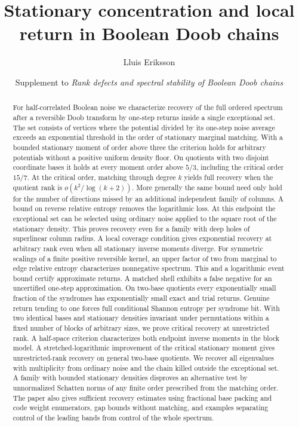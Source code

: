 \documentclass[11pt]{article}
\title{Stationary concentration and local return in Boolean Doob chains}
\author{Lluis Eriksson}
\date{Supplement to \emph{Rank defects and spectral stability of Boolean Doob chains}}
\begin{document}
\maketitle
\begin{abstract}
For half-correlated Boolean noise we characterize recovery of the full ordered spectrum after a reversible Doob transform by one-step returns inside a single exceptional set. The set consists of vertices where the potential divided by its one-step noise average exceeds an exponential threshold in the order of stationary marginal matching. With a bounded stationary moment of order above three the criterion holds for arbitrary potentials without a positive uniform density floor. On quotients with two disjoint coordinate bases it holds at every moment order above $5/3$, including the critical order $15/7$. At the critical order, matching through degree $k$ yields full recovery when the quotient rank is $o(k^2/\log(k+2))$. More generally the same bound need only hold for the number of directions missed by an additional independent family of columns. A bound on reverse relative entropy removes the logarithmic loss. At this endpoint the exceptional set can be selected using ordinary noise applied to the square root of the stationary density. This proves recovery even for a family with deep holes of superlinear column radius. A local coverage condition gives exponential recovery at arbitrary rank even when all stationary inverse moments diverge. For symmetric scalings of a finite positive reversible kernel, an upper factor of two from marginal to edge relative entropy characterizes nonnegative spectrum. This and a logarithmic event bound certify approximate returns. A matched shell exhibits a false negative for an uncertified one-step approximation. On two-base quotients every exponentially small fraction of the syndromes has exponentially small exact and trial returns. Genuine return tending to one forces full conditional Shannon entropy per syndrome bit. With two identical bases and stationary densities invariant under permutations within a fixed number of blocks of arbitrary sizes, we prove critical recovery at unrestricted rank. A half-space criterion characterizes both endpoint inverse moments in the block model. A stretched-logarithmic improvement of the critical stationary moment gives unrestricted-rank recovery on general two-base quotients. We recover all eigenvalues with multiplicity from ordinary noise and the chain killed outside the exceptional set. A family with bounded stationary densities disproves an alternative test by unnormalized Schatten norms of any finite order prescribed from the matching order. The paper also gives sufficient recovery estimates using fractional base packing and code weight enumerators, gap bounds without matching, and examples separating control of the leading bands from control of the whole spectrum.
\end{abstract}
\end{document}
